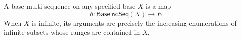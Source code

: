 \begin{definition}
A base multi-sequence on any specified base $X$ is a map
\[
h:\mathsf{BaseIncSeq}(X)\longrightarrow E.
\]
When $X$ is infinite, its arguments are precisely the increasing
enumerations of infinite subsets whose ranges are contained in $X$.
\end{definition}
